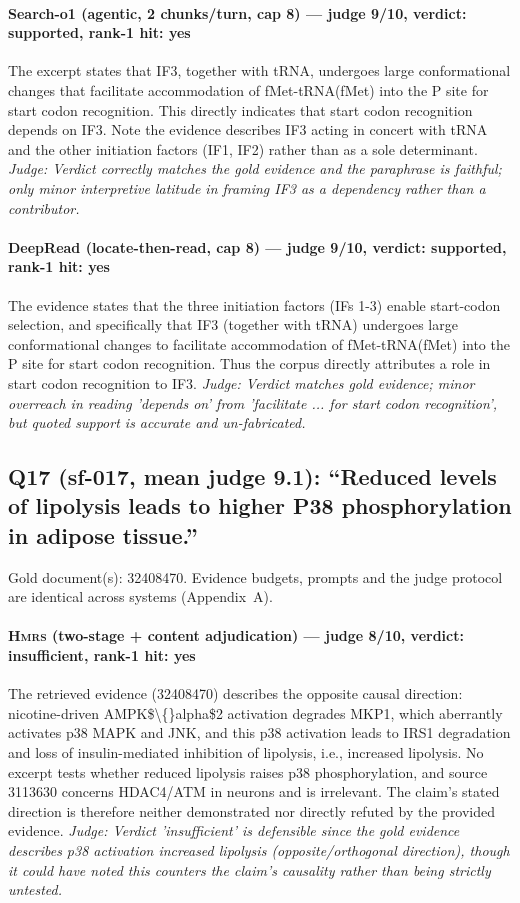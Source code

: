 \documentclass[sigconf, review, anonymous]{acmart}
\begin{document}
\paragraph{Search-o1 (agentic, 2 chunks/turn, cap 8) --- judge 9/10, verdict: supported, rank-1 hit: yes}
\noindent The excerpt states that IF3, together with tRNA, undergoes large conformational changes that facilitate accommodation of fMet-tRNA(fMet) into the P site for start codon recognition. This directly indicates that start codon recognition depends on IF3. Note the evidence describes IF3 acting in concert with tRNA and the other initiation factors (IF1, IF2) rather than as a sole determinant.
\noindent\small\textit{Judge: Verdict correctly matches the gold evidence and the paraphrase is faithful; only minor interpretive latitude in framing IF3 as a dependency rather than a contributor.}
\paragraph{DeepRead (locate-then-read, cap 8) --- judge 9/10, verdict: supported, rank-1 hit: yes}
\noindent The evidence states that the three initiation factors (IFs 1-3) enable start-codon selection, and specifically that IF3 (together with tRNA) undergoes large conformational changes to facilitate accommodation of fMet-tRNA(fMet) into the P site for start codon recognition. Thus the corpus directly attributes a role in start codon recognition to IF3.
\noindent\small\textit{Judge: Verdict matches gold evidence; minor overreach in reading 'depends on' from 'facilitate ... for start codon recognition', but quoted support is accurate and un-fabricated.}

\subsection{Q17 (sf-017, mean judge 9.1): ``Reduced levels of lipolysis leads to higher P38 phosphorylation in adipose tissue.''}
\label{app:q17}
\noindent Gold document(s): 32408470. Evidence budgets, prompts and the judge protocol are identical across systems (Appendix~A).
\paragraph{\textbf{\textsc{Hmrs}} (two-stage + content adjudication) --- judge 8/10, verdict: insufficient, rank-1 hit: yes}
\noindent The retrieved evidence (32408470) describes the opposite causal direction: nicotine-driven AMPK\$\textbackslash\{\}alpha\$2 activation degrades MKP1, which aberrantly activates p38 MAPK and JNK, and this p38 activation leads to IRS1 degradation and loss of insulin-mediated inhibition of lipolysis, i.e., increased lipolysis. No excerpt tests whether reduced lipolysis raises p38 phosphorylation, and source 3113630 concerns HDAC4/ATM in neurons and is irrelevant. The claim's stated direction is therefore neither demonstrated nor directly refuted by the provided evidence.
\noindent\small\textit{Judge: Verdict 'insufficient' is defensible since the gold evidence describes p38 activation  increased lipolysis (opposite/orthogonal direction), though it could have noted this counters the claim's causality rather than being strictly untested.}
\end{document}
